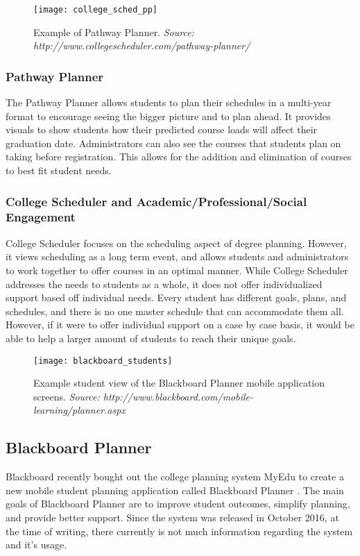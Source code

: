\begin{figure}[h]
\centering
\texttt{[image: college\_sched\_pp]}
\caption{Example of Pathway Planner. \textit{Source: http://www.collegescheduler.com/pathway-planner/}}
\end{figure}

\subsubsection{Pathway Planner}
The Pathway Planner allows students to plan their schedules in a multi-year format to encourage seeing the bigger picture and to plan ahead. It provides visuals to show students how their predicted course loads will affect their graduation date. Administrators can also see the courses that students plan on taking before registration. This allows for the addition and elimination of courses to best fit student needs. 

\subsubsection{College Scheduler and Academic/Professional/Social Engagement}
College Scheduler focuses on the scheduling aspect of degree planning. However, it views scheduling as a long term event, and allows students and administrators to work together to offer courses in an optimal manner. While College Scheduler addresses the needs to students as a whole, it does not offer individualized support based off individual needs. Every student has different goals, plans, and schedules, and there is no one master schedule that can accommodate them all. However, if it were to offer individual support on a case by case basis, it would be able to help a larger amount of students to reach their unique goals. 

\begin{figure}[h]
\centering
\texttt{[image: blackboard\_students]}
\caption{Example student view of the Blackboard Planner mobile application screens. \textit{Source: http://www.blackboard.com/mobile-learning/planner.aspx}}
\end{figure}
\subsection{Blackboard Planner} 
Blackboard recently bought out the college planning system MyEdu to create a new mobile student planning application called Blackboard Planner \cite{Blackboard}. The main goals of Blackboard Planner are to improve student outcomes, simplify planning, and provide better support. Since the system was released in October 2016, at the time of writing, there currently is not much information regarding the system and it's usage.

